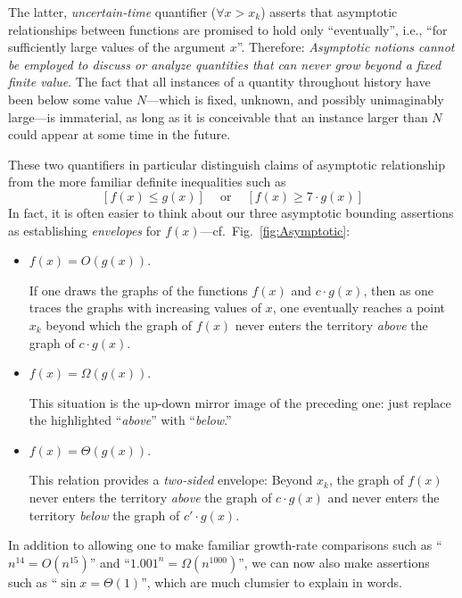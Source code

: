 \smallskip

The latter, {\em uncertain-time} quantifier ($\forall x > x_k$) asserts that asymptotic relationships between functions are promised to hold only ``eventually'', i.e., ``for sufficiently large values of the argument $x$''.  Therefore:  {\em Asymptotic notions cannot be employed to discuss or analyze quantities that can never grow beyond a fixed finite value}.  The fact that all instances of a quantity throughout history have been below some value $N$---which is fixed, unknown, and possibly unimaginably large---is immaterial, as long as it is conceivable that an instance larger than $N$ could appear at some time in the future.

\smallskip

These two quantifiers in particular distinguish claims of asymptotic relationship from the more familiar definite inequalities such as
\[ [f(x) \leq g(x)] \ \ \ \ \mbox{ or } \ \ \ \ [f(x) \geq 7 \cdot g(x)] \]
In fact, it is often easier to think about our three asymptotic bounding assertions as establishing {\em envelopes} for $f(x)$---cf.~Fig.~\ref{fig:Asymptotic}:
\begin{itemize}
\item
$f(x) = O(g(x))$.

If one draws the graphs of the functions $f(x)$ and $c \cdot g(x)$, then as one traces the graphs with increasing values of $x$, one eventually reaches a point $x_k$ beyond which the graph of $f(x)$ never enters the territory {\em above} the graph of $c \cdot g(x)$.
\medskip\item
$f(x) = \Omega(g(x))$.

This situation is the up-down mirror image of the preceding one: just replace the highlighted ``{\em above}'' with ``{\em below}.''
\medskip\item
$f(x) = \Theta(g(x))$.

This relation provides a {\em two-sided} envelope:  Beyond $x_k$, the graph of $f(x)$ never enters the territory {\em above} the graph of $c \cdot g(x)$ and never enters the territory
{\em below} the graph of $c' \cdot g(x)$.
\end{itemize}
In addition to allowing one to make familiar growth-rate comparisons such as ``$n^{14} = O(n^{15})$'' and ``$1.001^n = \Omega(n^{1000})$'', we can now also make assertions such as ``$\sin x = \Theta(1)$'', which are much clumsier to explain in words.

\medskip


